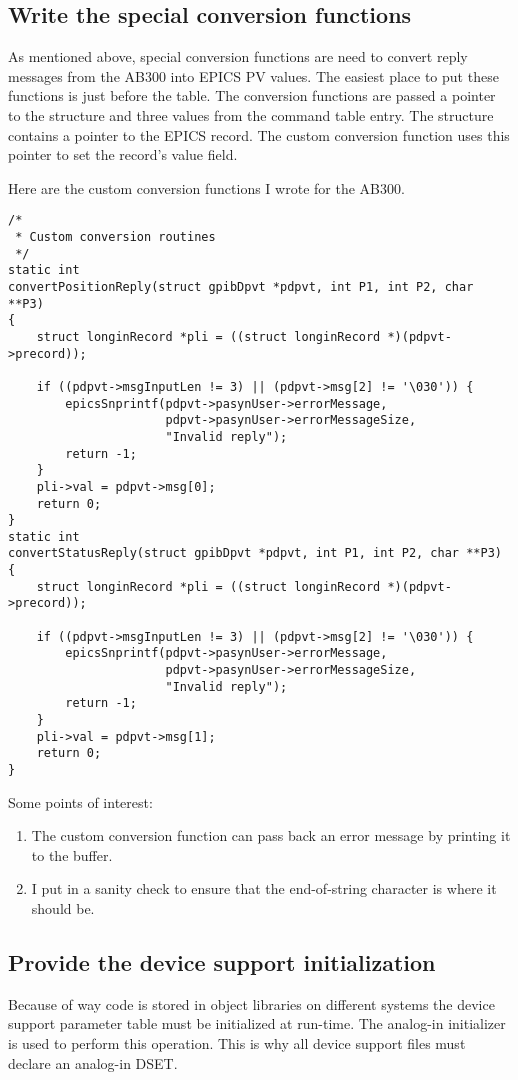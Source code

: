 \documentclass[twoside]{article}
\begin{document}
\subsection{Write the special conversion functions}
As mentioned above, special conversion functions are need to convert reply
messages from the AB300 into EPICS PV values.
The easiest place to put these functions is just before the
\verb@gpibCmds@ table.
The conversion functions are passed a pointer to the \verb@gpibDpvt@ structure
and three values from the command table entry.
The \verb@gpibDpvt@ structure contains a pointer to the EPICS record.
The custom conversion function uses this pointer
to set the record's value field.

Here are the custom conversion functions I wrote for the AB300.
\begin{verbatim}
/*
 * Custom conversion routines
 */
static int
convertPositionReply(struct gpibDpvt *pdpvt, int P1, int P2, char **P3)
{
    struct longinRecord *pli = ((struct longinRecord *)(pdpvt->precord));

    if ((pdpvt->msgInputLen != 3) || (pdpvt->msg[2] != '\030')) {
        epicsSnprintf(pdpvt->pasynUser->errorMessage,
                      pdpvt->pasynUser->errorMessageSize,
                      "Invalid reply");
        return -1;
    }
    pli->val = pdpvt->msg[0];
    return 0;
}
static int
convertStatusReply(struct gpibDpvt *pdpvt, int P1, int P2, char **P3)
{
    struct longinRecord *pli = ((struct longinRecord *)(pdpvt->precord));

    if ((pdpvt->msgInputLen != 3) || (pdpvt->msg[2] != '\030')) {
        epicsSnprintf(pdpvt->pasynUser->errorMessage,
                      pdpvt->pasynUser->errorMessageSize,
                      "Invalid reply");
        return -1;
    }
    pli->val = pdpvt->msg[1];
    return 0;
}
\end{verbatim}

Some points of interest:
\begin{enumerate}
\item
The custom conversion function can pass back an error message by printing
it to the \verb@errorMessage@ buffer.
\item
I put in a sanity check to ensure that the end-of-string character is where
it should be.
\end{enumerate}





\subsection{Provide the device support initialization}
Because of way code is stored in object libraries on different systems
the device support parameter table must be initialized at run-time.  The
analog-in initializer is used to perform this operation.  This is why
all device support files must declare an analog-in DSET.
\end{document}
